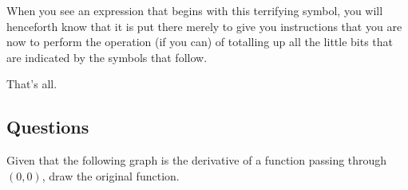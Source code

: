 When you see an expression that begins with this terrifying symbol, you will henceforth know that it is put
there merely to give you instructions that you are now to perform the operation (if you can) of totalling up
all the little bits that are indicated by the symbols that follow.

That's all.

\clearpage
\subsection*{Questions}
\begin{questions}
  \question Given that the following graph is the derivative of a function passing through $ (0,0) $, draw the original function.
      \begin{center}
      \end{center}
  \question
\end{questions}

